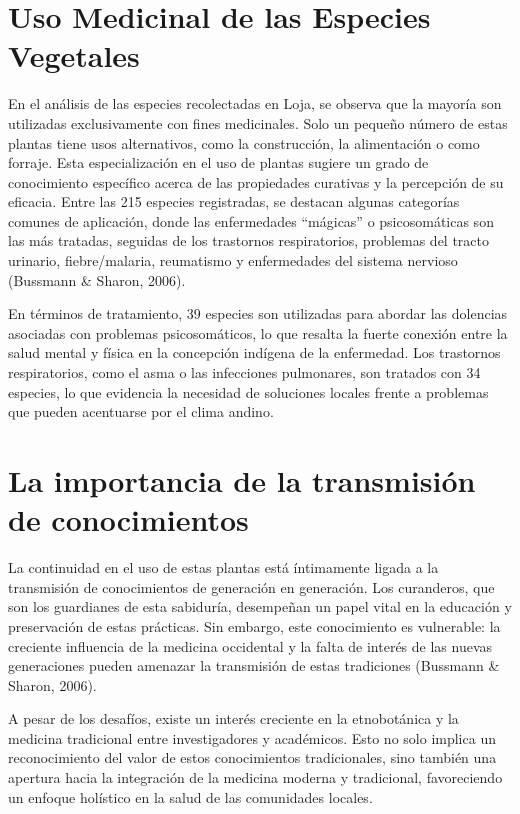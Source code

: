 \documentclass[
  letterpaper,
  DIV=11,
  numbers=noendperiod,
  oneside]{scrreprt}
\begin{document}
\section{Uso Medicinal de las Especies
Vegetales}\label{uso-medicinal-de-las-especies-vegetales}

En el análisis de las especies recolectadas en Loja, se observa que la
mayoría son utilizadas exclusivamente con fines medicinales. Solo un
pequeño número de estas plantas tiene usos alternativos, como la
construcción, la alimentación o como forraje. Esta especialización en el
uso de plantas sugiere un grado de conocimiento específico acerca de las
propiedades curativas y la percepción de su eficacia. Entre las 215
especies registradas, se destacan algunas categorías comunes de
aplicación, donde las enfermedades ``mágicas'' o psicosomáticas son las
más tratadas, seguidas de los trastornos respiratorios, problemas del
tracto urinario, fiebre/malaria, reumatismo y enfermedades del sistema
nervioso (Bussmann \& Sharon, 2006).

En términos de tratamiento, 39 especies son utilizadas para abordar las
dolencias asociadas con problemas psicosomáticos, lo que resalta la
fuerte conexión entre la salud mental y física en la concepción indígena
de la enfermedad. Los trastornos respiratorios, como el asma o las
infecciones pulmonares, son tratados con 34 especies, lo que evidencia
la necesidad de soluciones locales frente a problemas que pueden
acentuarse por el clima andino.

\section{La importancia de la transmisión de
conocimientos}\label{la-importancia-de-la-transmisiuxf3n-de-conocimientos}

La continuidad en el uso de estas plantas está íntimamente ligada a la
transmisión de conocimientos de generación en generación. Los
curanderos, que son los guardianes de esta sabiduría, desempeñan un
papel vital en la educación y preservación de estas prácticas. Sin
embargo, este conocimiento es vulnerable: la creciente influencia de la
medicina occidental y la falta de interés de las nuevas generaciones
pueden amenazar la transmisión de estas tradiciones (Bussmann \& Sharon,
2006).

A pesar de los desafíos, existe un interés creciente en la etnobotánica
y la medicina tradicional entre investigadores y académicos. Esto no
solo implica un reconocimiento del valor de estos conocimientos
tradicionales, sino también una apertura hacia la integración de la
medicina moderna y tradicional, favoreciendo un enfoque holístico en la
salud de las comunidades locales.
\end{document}
